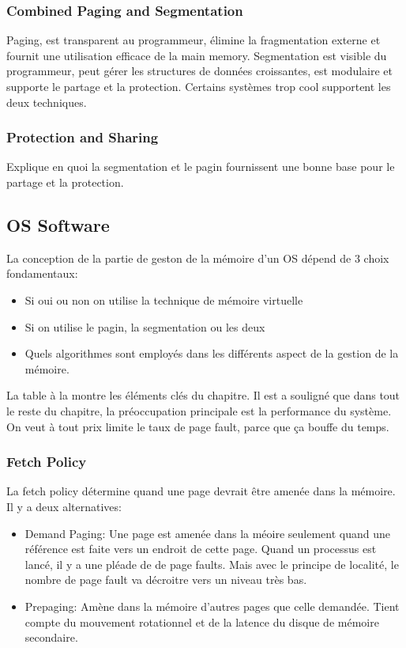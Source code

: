 \subsubsection{Combined Paging and Segmentation}
Paging, est transparent au programmeur, élimine la fragmentation externe et fournit une utilisation efficace de la main memory.
Segmentation est visible du programmeur, peut gérer les structures de données croissantes, est modulaire et supporte le partage et la protection.
Certains systèmes trop cool supportent les deux techniques.

\subsubsection{Protection and Sharing}
Explique en quoi la segmentation et le pagin fournissent une bonne base pour le partage et la protection.

\subsection{OS Software}
La conception de la partie de geston de la mémoire d'un OS dépend de 3 choix fondamentaux:
\begin{itemize}
  \item Si oui ou non on utilise la technique de mémoire virtuelle
  \item Si on utilise le pagin, la segmentation ou les deux
  \item Quels algorithmes sont employés dans les différents aspect de la gestion de la mémoire.
\end{itemize}
La table à la \cite[p.~381]{stallings} montre les éléments clés du chapitre.
Il est a souligné que dans tout le reste du chapitre, la préoccupation principale est la performance du système.
On veut à tout prix limite le taux de page fault, parce que ça bouffe du temps.

\subsubsection{Fetch Policy}
La fetch policy détermine quand une page devrait être amenée dans la mémoire.
Il y a deux alternatives:
\begin{itemize}
  \item Demand Paging: Une page est amenée dans la méoire seulement quand une référence est faite vers un endroit de cette page.
    Quand un processus est lancé, il y a une pléade de de page faults.
    Mais avec le principe de localité, le nombre de page fault va décroitre vers un niveau très bas.
  \item Prepaging: Amène dans la mémoire d'autres pages que celle demandée.
    Tient compte du mouvement rotationnel et de la latence du disque de mémoire secondaire.
\end{itemize}

